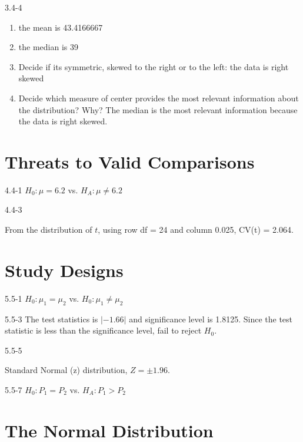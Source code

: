 \begin{exsol@solution}{3.4-4}


\begin{enumerate}
\item the mean is 43.4166667
\item the median is 39
\item Decide if its symmetric, skewed to the right or to the left: the data is right skewed
\item Decide which measure of center provides the most relevant information about the distribution? Why?  The median is the most relevant information because the data is right skewed.
\end{enumerate}

\end{exsol@solution}
\setcounter{chapter}{4}\chapter{Threats to Valid Comparisons}
\begin{exsol@solution}{4.4-1}
	  $H_0: \mu = 6.2$ vs. $H_A: \mu \neq 6.2$
\end{exsol@solution}
\begin{exsol@solution}{4.4-3}

    From the distribution of $t$, using row df = 24 and column 0.025, CV(t) = 2.064.
\end{exsol@solution}
\setcounter{chapter}{5}\chapter{Study Designs}
\begin{exsol@solution}{5.5-1}
	  $H_0: \mu_1 = \mu_2$ vs. $H_0: \mu_1 \neq \mu_2$
\end{exsol@solution}
\begin{exsol@solution}{5.5-3}
The test statistics is $|-1.66|$ and significance level is 1.8125.  Since the test statistic is less than the significance level, fail to reject $H_0$.
\end{exsol@solution}
\begin{exsol@solution}{5.5-5}

    Standard Normal (z) distribution, $Z = \pm 1.96$.
\end{exsol@solution}
\begin{exsol@solution}{5.5-7}
    $H_0: P_1 = P_2$ vs. $H_A: P_1 > P_2$
\end{exsol@solution}
\setcounter{chapter}{6}\chapter{The Normal Distribution}
